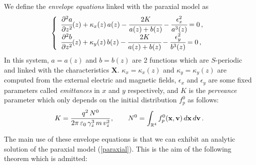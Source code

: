 \documentclass[10pt]{article}
\newcommand{\R}{{\mathbb R}}
\newcommand{\D}{{\partial}}
\begin{document}
We define the \textit{envelope equations} linked with the paraxial model as
\begin{equation} \label{envelope}
\left\{
\begin{array}{l}
\cfrac{\D^{2}a}{\D z^{2}}(z) + \kappa_{x}(z) \, a(z) - \cfrac{2K}{a(z)+b(z)} - \cfrac{\epsilon_{x}^{2}}{a^{3}(z)} = 0 \, , \\
\cfrac{\D^{2}b}{\D z^{2}}(z) + \kappa_{y}(z) \, b(z) - \cfrac{2K}{a(z)+b(z)} - \cfrac{\epsilon_{y}^{2}}{b^{3}(z)} = 0 \, ,
\end{array}
\right.
\end{equation}
In this system, $a = a(z)$ and $b = b(z)$ are 2 functions which are $S$-periodic and linked with the characteristics $\mathbf{X}$. $\kappa_{x} = \kappa_{x}(z)$ and $\kappa_{y} = \kappa_{y}(z)$ are computed from the external electric and magnetic fields, $\epsilon_{x}$ and $\epsilon_{y}$ are some fixed parameters called \textit{emittances} in $x$ and $y$ respectively, and $K$ is the \textit{perveance} parameter which only depends on the initial distribution $f_{p}^{0}$ as follows:
\begin{equation}
K = \cfrac{q^{2}\,N^{0}}{2\pi\,\varepsilon_{0}\,\gamma_{z}^{3}\,m\,v_{z}^{2}} \, , \qquad N^{0} = \int_{\R^{4}} f_{p}^{0}(\mathbf{x},\mathbf{v}) \, d\mathbf{x} \, d\mathbf{v} \, .
\end{equation}

\indent The main use of these envelope equations is that we can exhibit an analytic solution of the paraxial model (\ref{paraxial}). This is the aim of the following theorem which is admitted:
\end{document}
